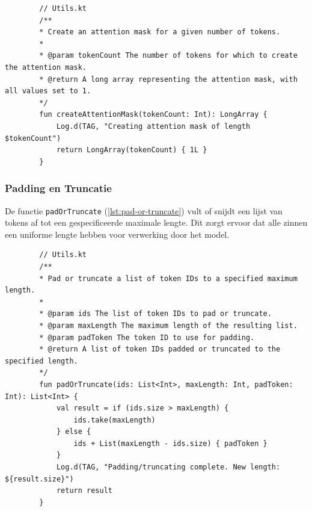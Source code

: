 \begin{listing}
    \begin{verbatim}
        // Utils.kt
        /**
        * Create an attention mask for a given number of tokens.
        *
        * @param tokenCount The number of tokens for which to create the attention mask.
        * @return A long array representing the attention mask, with all values set to 1.
        */
        fun createAttentionMask(tokenCount: Int): LongArray {
            Log.d(TAG, "Creating attention mask of length $tokenCount")
            return LongArray(tokenCount) { 1L }
        }
    \end{verbatim}
    \caption[\texttt{createAttentionMask}]{De \texttt{createAttentionMask} functie creëert een aandachtmasker voor een gespecificeerd aantal tokens, waarbij alle waarden worden ingesteld op 1.}
    \label{lst:create-attention-mask}
\end{listing}

\subsubsection{Padding en Truncatie}

De functie \texttt{padOrTruncate} (\ref{lst:pad-or-truncate}) vult of snijdt een lijst van tokens af tot een gespecificeerde maximale lengte. Dit zorgt ervoor dat alle zinnen een uniforme lengte hebben voor verwerking door het model.

\begin{listing}
    \begin{verbatim}
        // Utils.kt
        /**
        * Pad or truncate a list of token IDs to a specified maximum length.
        *
        * @param ids The list of token IDs to pad or truncate.
        * @param maxLength The maximum length of the resulting list.
        * @param padToken The token ID to use for padding.
        * @return A list of token IDs padded or truncated to the specified length.
        */
        fun padOrTruncate(ids: List<Int>, maxLength: Int, padToken: Int): List<Int> {
            val result = if (ids.size > maxLength) {
                ids.take(maxLength)
            } else {
                ids + List(maxLength - ids.size) { padToken }
            }
            Log.d(TAG, "Padding/truncating complete. New length: ${result.size}")
            return result
        }
    \end{verbatim}
    \caption[\texttt{padOrTruncate}]{De \texttt{padOrTruncate} functie past padding of truncatie toe op een lijst van tokens, zodat deze overeenkomt met een gespecificeerde maximale lengte.}
    \label{lst:pad-or-truncate}
\end{listing}

